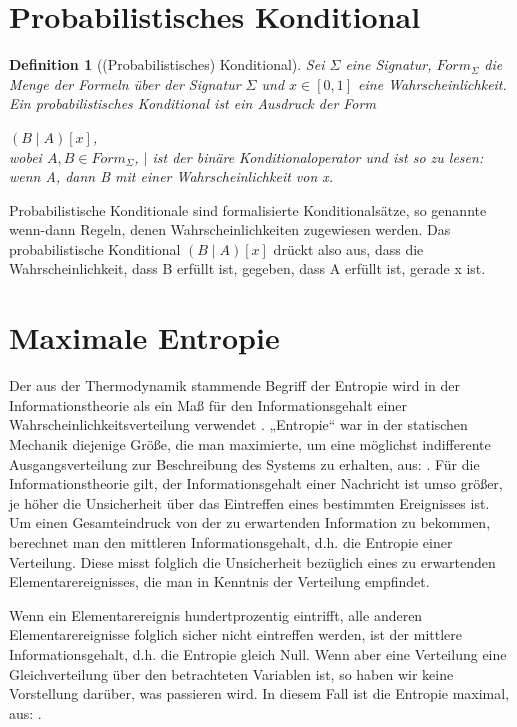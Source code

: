 \documentclass[a4paper, 11pt]{book}
\newtheorem{Def}{Definition }[section]
\begin{document}
{\section{Probabilistisches Konditional}
\label{probKond}
\begin{Def}[(Probabilistisches) Konditional] 
Sei $ \Sigma $ eine Signatur, $ Form_{\Sigma} $ die Menge der Formeln über der Signatur $ \Sigma $ und $ x \in [0, 1] $ eine Wahrscheinlichkeit.
Ein probabilistisches Konditional ist ein Ausdruck der Form

\hspace{3 cm} $ (B \mid A)[x] $, \\
wobei $ A, B \in Form_\Sigma $, $ \mid $ ist der binäre Konditionaloperator und ist so zu lesen: wenn A, dann B mit einer Wahrscheinlichkeit von x. 
\end{Def}
Probabilistische Konditionale sind formalisierte Konditionalsätze, so genannte wenn-dann Regeln, denen Wahrscheinlichkeiten zugewiesen werden.
Das probabilistische Konditional $ (B \mid A)[x] $ drückt also aus, dass die Wahrscheinlichkeit, dass B erfüllt ist, gegeben, dass A erfüllt ist, gerade x ist.




\section{Maximale Entropie} 
\label{MaxEnt}
Der aus der Thermodynamik stammende Begriff der Entropie wird in der Informationstheorie als ein Maß für den Informationsgehalt einer Wahrscheinlichkeitsverteilung verwendet \cite{RKI97}.
„Entropie“ war in der statischen Mechanik diejenige Größe, die man maximierte, um eine möglichst indifferente Ausgangsverteilung zur Beschreibung des Systems zu erhalten, aus: \cite{BKI08}.
Für die Informationstheorie gilt, der Informationsgehalt einer Nachricht ist umso größer, je höher die Unsicherheit über das Eintreffen eines bestimmten Ereignisses ist. Um einen Gesamteindruck von der zu erwartenden Information zu bekommen, berechnet man den mittleren Informationsgehalt, d.h. die Entropie einer Verteilung. Diese misst folglich die Unsicherheit bezüglich eines zu erwartenden Elementarereignisses, die man in Kenntnis der Verteilung empfindet.

Wenn ein Elementarereignis hundertprozentig eintrifft, alle anderen Elementarereignisse folglich sicher nicht eintreffen werden, ist der mittlere Informationsgehalt, d.h. die Entropie gleich Null. Wenn aber eine Verteilung eine Gleichverteilung über den betrachteten Variablen ist, so haben wir keine Vorstellung darüber, was passieren wird. In diesem Fall ist die Entropie maximal, aus: \cite{BKI08}.

}
\end{document}
